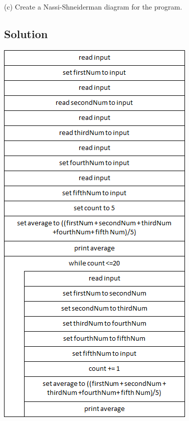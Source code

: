 \documentclass{article}
\begin{document}
    (c) Create a Nassi-Shneiderman diagram for the program.

    \subsection*{Solution}

    \begin{center}
        \includegraphics[scale=0.6]{Problem2_c.png}
    \end{center}
\end{document}
